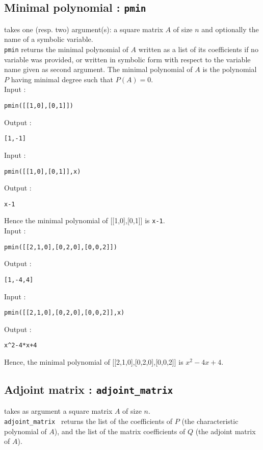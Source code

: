 \documentclass[a4paper,11pt]{book}
\begin{document}
\subsection{Minimal polynomial : {\tt pmin}}
  takes one (resp. two) argument(s):
a square matrix $A$ of size $n$ and optionally
the name of a symbolic variable.\\
{\tt pmin} returns the minimal polynomial of $A$ written as a
list of its coefficients if no variable was provided, or
written in symbolic form with respect to the  
variable name given as second argument.
The minimal polynomial of $A$ is the polynomial $P$ 
having minimal degree such that $P(A)=0$.\\
Input :
\begin{center}{\tt pmin([[1,0],[0,1]])}\end{center}
Output :
\begin{center}{\tt [1,-1]}\end{center}
Input :
\begin{center}{\tt pmin([[1,0],[0,1]],x)}\end{center}
Output :
\begin{center}{\tt x-1}\end{center}
Hence the minimal polynomial of [[1,0],[0,1]] is {\tt x-1}.\\
Input :
\begin{center}{\tt pmin([[2,1,0],[0,2,0],[0,0,2]])}\end{center}
Output :
\begin{center}{\tt [1,-4,4]}\end{center}
 Input :
\begin{center}{\tt pmin([[2,1,0],[0,2,0],[0,0,2]],x)}\end{center}
Output :
\begin{center}{\tt x\verb|^|2-4*x+4}\end{center}
Hence, the minimal polynomial of [[2,1,0],[0,2,0],[0,0,2]] is $x^2-4x+4$.

\subsection{Adjoint matrix : {\tt adjoint\_matrix}}
 takes as argument  a square matrix 
$A$ of size $n$.\\
{\tt adjoint\_matrix } returns the list of the coefficients of $P$ 
(the characteristic polynomial of $A$), and
the list of the matrix coefficients of $Q$ (the adjoint matrix 
of $A$). 
\end{document}
